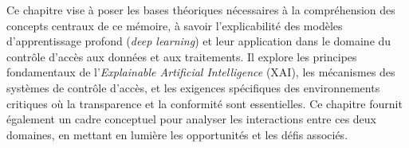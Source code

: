 \label{chapCadreTheorique}


\label{sectionintoCadretheorique}
Ce chapitre vise à poser les bases théoriques nécessaires à la compréhension des concepts centraux de ce mémoire, à savoir l'explicabilité des modèles d'apprentissage profond (\textit{deep learning}) et leur application dans le domaine du contrôle d'accès aux données et aux traitements. Il explore les principes fondamentaux de l'\textit{Explainable Artificial Intelligence} (XAI), les mécanismes des systèmes de contrôle d'accès, et les exigences spécifiques des environnements critiques où la transparence et la conformité sont essentielles. Ce chapitre fournit également un cadre conceptuel pour analyser les interactions entre ces deux domaines, en mettant en lumière les opportunités et les défis associés.











